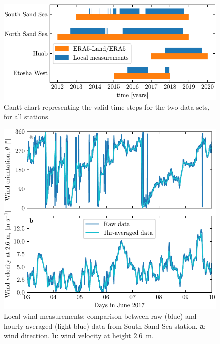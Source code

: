 \begin{figure}[p]
\centering
\includegraphics[scale=1]{Figures/Figure1_supp.pdf}
\caption{Gantt chart representing the valid time steps for the two data sets, for all stations.}
\label{Fig1_supp}
\end{figure}

\begin{figure}[p]
\centering
\includegraphics[scale=1]{Figures/Figure2_supp.pdf}
\caption{Local wind measurements: comparison between raw (blue) and hourly-averaged (light blue) data from South Sand Sea station. \textbf{a}: wind direction. \textbf{b}: wind velocity at height $2.6$~m.}
\label{Fig2_supp}
\end{figure}

